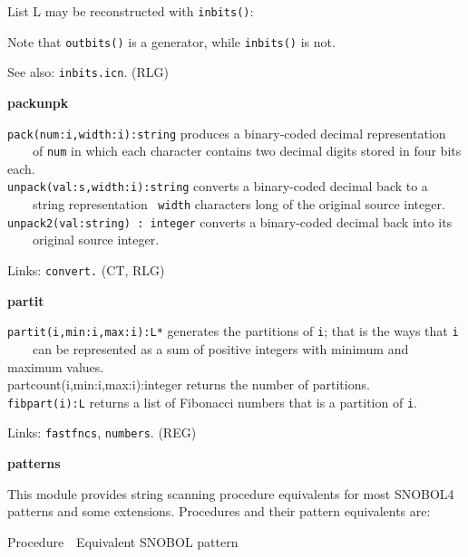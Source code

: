 List L may be reconstructed with \texttt{inbits()}:


Note that \texttt{outbits()} is a generator, while
\texttt{inbits()} is not.

See also: \texttt{inbits.icn}. (RLG)

{\sffamily\bfseries
packunpk}

\texttt{pack(num:i,width:i):string} produces a binary-coded decimal
representation\\
 \ \ \ \ of \texttt{num} in which each character contains two decimal
digits stored in four bits each.\\
\texttt{unpack(val:s,width:i):string} converts a binary-coded decimal
back to a\\
 \ \ \ \ string representation \ \texttt{width} characters long of the
original source integer.\\
\texttt{unpack2(val:string) : integer} converts a binary-coded decimal
back into its\\
 \ \ \ \ original source integer.

Links: \texttt{convert.} (CT, RLG)

{\sffamily\bfseries
partit}

\texttt{partit(i,min:i,max:i):L*} generates the partitions of
\texttt{i}; that is the ways that \texttt{i\\
} \ \ \ \ can be represented as a sum of positive integers with minimum
and maximum values.\\
partcount(i,min:i,max:i):integer returns the number of
partitions.\\
\texttt{fibpart(i):L} returns a list of Fibonacci numbers that is a
partition of \texttt{i}.

Links: \texttt{fastfncs}, \texttt{numbers}. (REG)

{\sffamily\bfseries
patterns}

This module provides string scanning procedure equivalents for most
SNOBOL4 patterns and some
extensions. Procedures and their pattern equivalents are:

Procedure\ \ Equivalent SNOBOL pattern

